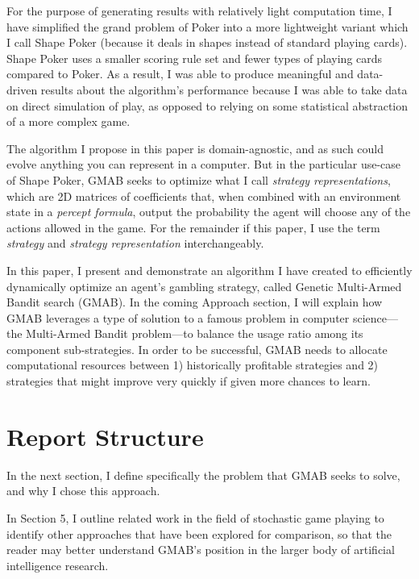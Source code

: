 \documentclass[11pt]{article}
\begin{document}
For the purpose of generating results with relatively light computation time, I have simplified the grand problem of Poker into a more lightweight variant which I call Shape Poker (because it deals in shapes instead of standard playing cards). Shape Poker uses a smaller scoring rule set and fewer types of playing cards compared to Poker. As a result, I was able to produce meaningful and data-driven results about the algorithm's performance because I was able to take data on direct simulation of play, as opposed to relying on some statistical abstraction of a more complex game.

The algorithm I propose in this paper is domain-agnostic, and as such could evolve anything you can represent in a computer. But in the particular use-case of Shape Poker, GMAB seeks to optimize what I call \textit{strategy representations}, which are 2D matrices of coefficients that, when combined with an environment state in a \textit{percept formula}, output the probability the agent will choose any of the actions allowed in the game. For the remainder if this paper, I use the term \textit{strategy} and \textit{strategy representation} interchangeably.

In this paper, I present and demonstrate an algorithm I have created to efficiently dynamically optimize an agent's gambling strategy, called Genetic Multi-Armed Bandit search (GMAB).
In the coming Approach section, I will explain how GMAB leverages a type of solution to a famous problem in computer science---the Multi-Armed Bandit problem---to balance the usage ratio among its component sub-strategies. In order to be successful, GMAB needs to allocate computational resources between 1) historically profitable strategies and 2) strategies that might improve very quickly if given more chances to learn.

\section{Report Structure}

In the next section, I define specifically the problem that GMAB seeks to solve, and why I chose this approach. 

In Section 5, I outline related work in the field of stochastic game playing to identify other approaches that have been explored for comparison, so that the reader may better understand GMAB's position in the larger body of artificial intelligence research.
\end{document}
